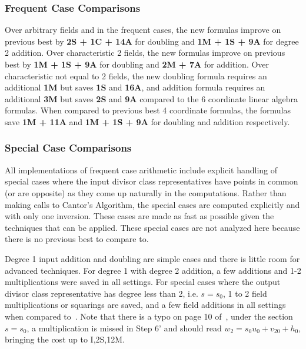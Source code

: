 \subsubsection{Frequent Case Comparisons}
Over arbitrary fields and in the frequent cases, the new formulas improve on
previous best by \textbf{2S + 1C + 14A} for doubling and \textbf{1M + 1S + 9A}
for degree 2 addition. Over characteristic 2 fields, the new formulas improve on
previous best by \textbf{1M + 1S + 9A} for doubling and \textbf{2M + 7A} for
addition. Over characteristic not equal to 2 fields, the new doubling formula
requires an additional \textbf{1M} but saves \textbf{1S} and \textbf{16A}, and
addition formula requires an additional \textbf{3M} but saves \textbf{2S} and
\textbf{9A} compared to the 6 coordinate linear algebra formulas. When compared
to previous best 4 coordinate formulas, the formulas save \textbf{1M + 11A} and
\textbf{1M + 1S + 9A} for doubling and addition respectively. 

\subsubsection{Special Case Comparisons}
All implementations of frequent case arithmetic include explicit handling of
special cases where the input divisor class representatives have points in
common (or are opposite) as they come up naturally in the computations. Rather
than making calls to Cantor's Algorithm, the special cases are computed
explicitly and with only one inversion. These cases are made as fast as possible
given the techniques that can be applied. These special cases are not analyzed
here because there is no previous best to compare to.

Degree 1 input addition and doubling are simple cases and there is little room
for advanced techniques. For degree 1 with degree 2 addition, a few additions
and 1-2 multiplications were saved in all settings. For special cases where the
output divisor class representative has degree less than 2, i.e. $s = s_0$, 1
to 2 field multiplications or squarings are saved, and a few field additions in
all settings when compared to~\cite{Lange_explicit_2005}. Note that there is a
typo on page 10 of~\cite{Lange_explicit_2005}, under the section $s = s_0$, a
multiplication is missed in Step 6' and should read $w_2 = s_0u_0 + v_{20} +
h_0$, bringing the cost up to I,2S,12M.









